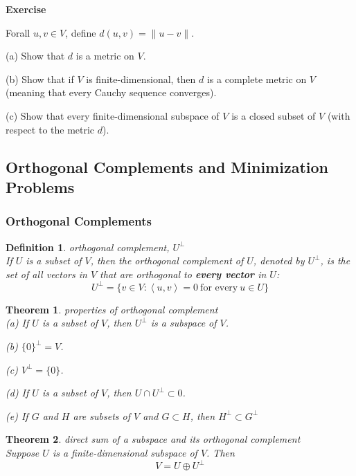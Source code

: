 \documentclass{article}
\newtheorem{theorem}{Theorem}[subsection]
\newtheorem{definition}{Definition}[subsection]
\newenvironment{exercise}{%
{\textbf{Exercise\\}
    }
}{
}
\begin{document}
\begin{CJK}{UTF8}{gkai}
\begin{exercise}
    Forall $u,v \in V$, define $d(u,v) = \|u-v\|$.

    (a) Show that $d$ is a metric on $V$.

    (b) Show that if $V$ is finite-dimensional, then $d$ is a complete metric on $V$
    (meaning that every Cauchy sequence converges).

    (c) Show that every finite-dimensional subspace of $V$ is a closed subset of $V$ (with respect to the metric $d$).
\end{exercise}


\subsection{Orthogonal Complements and Minimization Problems}

\subsubsection{Orthogonal Complements}

\begin{definition}
    orthogonal complement, $U^\bot$\\

    If $U$ is a subset of $V$, then the orthogonal complement of $U$, denoted by $U^\bot$, is the set of all vectors in $V$ that are orthogonal to \textbf{every vector} in $U$: 
    \[U^\bot = \{v \in V : \left<u,v\right> = 0 ~\text{for every}~ u \in U\}\]
\end{definition}

\begin{theorem}
    properties of orthogonal complement\\

    (a) If $U$ is a subset of $V$, then $U^\bot$ is a subspace of $V$.

    (b) $\{0\}^\bot = V$.

    (c) $V^\bot = \{0\}$.

    (d) If $U$ is a subset of $V$, then $U \cap U^\bot \subset {0}$.

    (e) If $G$ and $H$ are subsets of $V$ and $G \subset H$, then $H^\bot \subset G^\bot$
\end{theorem}

\begin{theorem}
    direct sum of a subspace and its orthogonal complement\\

    Suppose $U$ is a finite-dimensional subspace of $V$. Then
    \[V =U\oplus U^\bot\]
\end{theorem}


\end{CJK}
\end{document}
